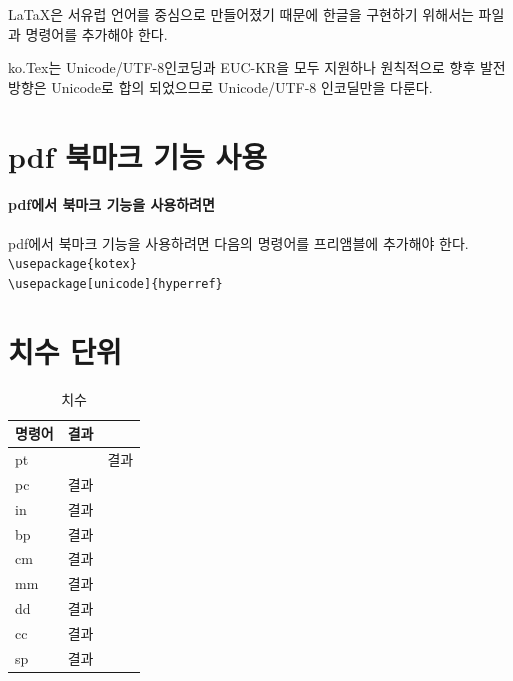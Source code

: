 \documentclass[12pt, a4paper, oneside]{book}
\let\stdsection\section
\renewcommand\section{\newpage\stdsection}
\begin{document}
	
	LaTaX은 서유럽 언어를 중심으로 만들어졌기 때문에 한글을 구현하기 위해서는 파일과 명령어를 추가해야 한다.

	ko.Tex는 Unicode/UTF-8인코딩과 EUC-KR을 모두 지원하나 
	원칙적으로 향후 발전 방향은 Unicode로 합의 되었으므로 Unicode/UTF-8 인코딜만을 다룬다.
	
	
	
	
	
\newpage
\section{pdf 북마크 기능 사용}
\null

		
	\paragraph{pdf에서 북마크 기능을 사용하려면}
	pdf에서 북마크 기능을 사용하려면 다음의 명령어를 프리앰블에 추가해야 한다.\\
	\verb|\usepackage{kotex}| \\
	\verb|\usepackage[unicode]{hyperref}| 

\newpage
\section{치수 단위}
\null

		\begin{table}[hbp]
		\caption{치수}
		\centering
		\begin{tabular}{l  l  l }
		\toprule
		명령어 & 결과 \\
		\toprule
		pt		&  &\normalsize{결과}\\
		pc		& \scriptsize{결과} \\
		in  		& \footnotesize{결과} \\
		bp 		& \small{결과} \\
		cm  	& \normalsize{결과} \\
		mm  	& \large{결과} \\
		dd 		& \Large{결과} \\
		cc 		& \LARGE{결과} \\
		sp 		& \huge{결과} \\
		\bottomrule
		\end{tabular}%
		\end{table}%
\end{document}
